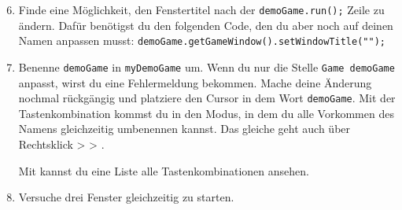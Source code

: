 \begin{enumerate} \setcounter{enumi}{5}
    \item \optional Finde eine Möglichkeit, den Fenstertitel nach der \lstinline{demoGame.run();} Zeile zu ändern.
        Dafür benötigst du den folgenden Code, den du aber noch auf deinen Namen anpassen musst: \lstinline{demoGame.getGameWindow().setWindowTitle("");}
    \item \optional Benenne \lstinline{demoGame} in \lstinline{myDemoGame} um.
        Wenn du nur die Stelle \lstinline{Game demoGame} anpasst, wirst du eine Fehlermeldung bekommen.
        Mache deine Änderung nochmal rückgängig und platziere den Cursor in dem Wort \lstinline{demoGame}.
        Mit der Tastenkombination  kommst du in den  Modus, in dem du alle Vorkommen des Namens gleichzeitig umbenennen kannst.
        Das gleiche geht auch über Rechtsklick >  > .

        Mit  kannst du eine Liste alle Tastenkombinationen ansehen.
    \item \optional Versuche drei Fenster gleichzeitig zu starten. 
\end{enumerate}
